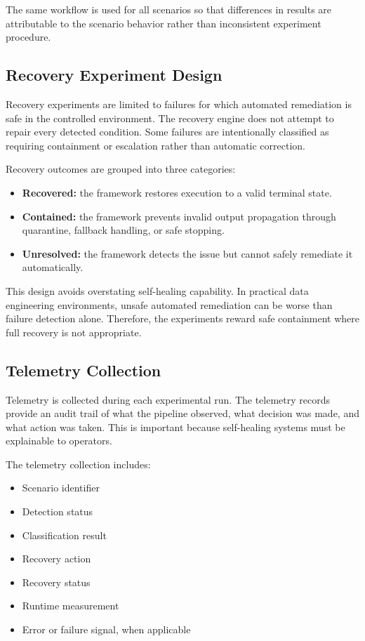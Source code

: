 The same workflow is used for all scenarios so that differences in results are attributable to the scenario behavior rather than inconsistent experiment procedure.

\subsection{Recovery Experiment Design}

Recovery experiments are limited to failures for which automated remediation is safe in the controlled environment. The recovery engine does not attempt to repair every detected condition. Some failures are intentionally classified as requiring containment or escalation rather than automatic correction.

Recovery outcomes are grouped into three categories:

\begin{itemize}
    \item \textbf{Recovered:} the framework restores execution to a valid terminal state.
    \item \textbf{Contained:} the framework prevents invalid output propagation through quarantine, fallback handling, or safe stopping.
    \item \textbf{Unresolved:} the framework detects the issue but cannot safely remediate it automatically.
\end{itemize}

This design avoids overstating self-healing capability. In practical data engineering environments, unsafe automated remediation can be worse than failure detection alone. Therefore, the experiments reward safe containment where full recovery is not appropriate.

\subsection{Telemetry Collection}

Telemetry is collected during each experimental run. The telemetry records provide an audit trail of what the pipeline observed, what decision was made, and what action was taken. This is important because self-healing systems must be explainable to operators.

The telemetry collection includes:

\begin{itemize}
    \item Scenario identifier
    \item Detection status
    \item Classification result
    \item Recovery action
    \item Recovery status
    \item Runtime measurement
    \item Error or failure signal, when applicable
\end{itemize}

